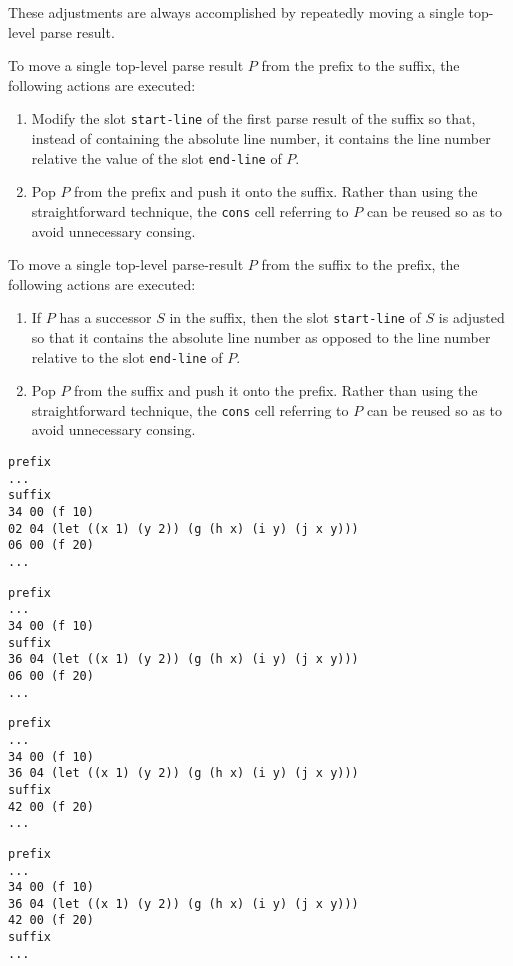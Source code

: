 These adjustments are always accomplished by repeatedly moving a
single top-level parse result.

To move a single top-level parse result $P$ from the prefix to the
suffix, the following actions are executed:

\begin{enumerate}
\item Modify the slot \texttt{start-line} of the first parse result of
  the suffix so that, instead of containing the absolute line number,
  it contains the line number relative the value of the slot
  \texttt{end-line} of $P$.
\item Pop $P$ from the prefix and push it onto the suffix.  Rather
  than using the straightforward technique, the \texttt{cons} cell
  referring to $P$ can be reused so as to avoid unnecessary consing.
\end{enumerate}

To move a single top-level parse-result $P$ from the suffix to the
prefix, the following actions are executed:

\begin{enumerate}
\item If $P$ has a successor $S$ in the suffix, then the slot
  \texttt{start-line} of $S$ is adjusted so that it contains the
  absolute line number as opposed to the line number relative to the
  slot \texttt{end-line} of $P$.
\item Pop $P$ from the suffix and push it onto the prefix.  Rather
  than using the straightforward technique, the \texttt{cons} cell
  referring to $P$ can be reused so as to avoid unnecessary consing.
\end{enumerate}

\begin{verbatim}
prefix
...
suffix
34 00 (f 10)
02 04 (let ((x 1) (y 2)) (g (h x) (i y) (j x y)))
06 00 (f 20)
...
\end{verbatim}

\begin{verbatim}
prefix
...
34 00 (f 10)
suffix
36 04 (let ((x 1) (y 2)) (g (h x) (i y) (j x y)))
06 00 (f 20)
...
\end{verbatim}

\begin{verbatim}
prefix
...
34 00 (f 10)
36 04 (let ((x 1) (y 2)) (g (h x) (i y) (j x y)))
suffix
42 00 (f 20)
...
\end{verbatim}

\begin{verbatim}
prefix
...
34 00 (f 10)
36 04 (let ((x 1) (y 2)) (g (h x) (i y) (j x y)))
42 00 (f 20)
suffix
...
\end{verbatim}

